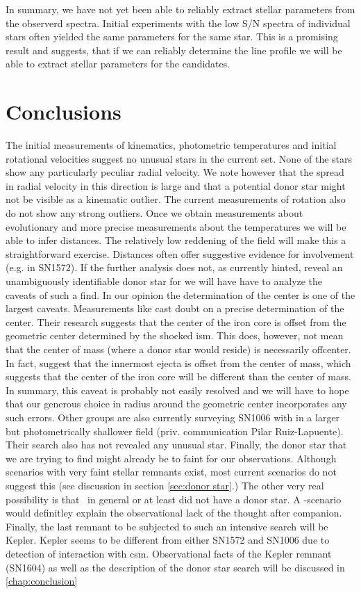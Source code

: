 In summary, we have not yet been able to reliably extract stellar parameters from the observerd spectra. Initial experiments with the low S/N spectra of individual stars often yielded the same parameters for the same star. This is a promising result and suggests, that if we can reliably determine the line profile we will be able to extract stellar parameters for the candidates.


\section{Conclusions}

The initial measurements of kinematics, photometric temperatures and initial rotational velocities suggest no unusual stars in the current set. None of the stars show any particularly peculiar radial velocity. We note however that the spread in radial velocity in this direction is large and that a potential donor star might not be visible as a kinematic outlier. The current measurements of rotation also do not show any strong outliers.
Once we obtain measurements about evolutionary and more precise measurements about the temperatures we will be able to infer distances. The relatively low reddening of the field will make this a straightforward exercise. Distances often offer suggestive evidence for involvement (e.g. \starg in SN1572). If the further analysis does not, as currently hinted, reveal an unambiguously identifiable donor star for  we will have have to analyze the caveats of such a find. In our opinion the determination of the center is one of the largest caveats. Measurements like \citet{2005ApJ...624..189W} cast doubt on a precise determination of the center. Their research suggests that the center of the iron core is offset from the geometric center determined by the shocked \gls{ism}. This does, however, not mean that the center of mass (where a donor star would reside) is necessarily offcenter. In fact, \cite{2010ApJ...708.1703M} suggest that the innermost ejecta is offset from the center of mass, which suggests that the center of the iron core will be different than the center of mass. In summary, this caveat is probably not easily resolved and we will have to hope that our generous choice in radius around the geometric center incorporates any such errors. Other groups are also currently surveying SN1006 with in a larger but photometrically shallower field (priv. communication Pilar Ruiz-Lapuente). Their search also has not revealed any unusual star. Finally, the donor star that we are trying to find might already be to faint for our observations. Although scenarios with very faint stellar remnants exist, most current scenarios do not suggest this (see discussion in section \ref{sec:donor star}.) The other very real possibility is that \sneia\ in general or at least  did not have a donor star. A \dd-scenario would definitley explain the observational lack of the thought after companion. 
Finally, the last remnant to be subjected to such an intensive search will be Kepler. Kepler seems to be different from either SN1572 and SN1006 due to detection of interaction with \gls{csm}. Observational facts of the Kepler remnant (SN1604) as well as the description of the donor star search will be discussed in \ref{chap:conclusion}

